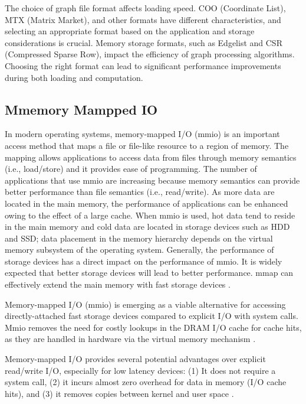 
The choice of graph file format affects loading speed. COO (Coordinate List), MTX (Matrix Market), and other formats have different characteristics, and selecting an appropriate format based on the application and storage considerations is crucial. Memory storage formats, such as Edgelist and CSR (Compressed Sparse Row), impact the efficiency of graph processing algorithms. Choosing the right format can lead to significant performance improvements during both loading and computation.


\subsection{Mmemory Mampped IO}
\label{sec:mmio}

In modern operating systems, memory-mapped I/O (mmio) is an important access method that maps a file or file-like resource to a region of memory. The mapping allows applications to access data from files through memory semantics (i.e., load/store) and it provides ease of programming. The number of applications that use mmio are increasing because memory semantics can provide better performance than file semantics (i.e., read/write). As more data are located in the main memory, the performance of applications can be enhanced owing to the effect of a large cache. When mmio is used, hot data tend to reside in the main memory and cold data are located in storage devices such as HDD and SSD; data placement in the memory hierarchy depends on the virtual memory subsystem of the operating system. Generally, the performance of storage devices has a direct impact on the performance of mmio. It is widely expected that better storage devices will lead to better performance. mmap can effectively extend the main memory with fast storage devices \cite{song2016efficient}.

Memory-mapped I/O (mmio) is emerging as a viable alternative for accessing directly-attached fast storage devices compared to explicit I/O with system calls. Mmio removes the need for costly lookups in the DRAM I/O cache for cache hits, as they are handled in hardware via the virtual memory mechanism \cite{malliotakis2021hugemap}.

Memory-mapped I/O provides several potential advantages over explicit read/write I/O, especially for low latency devices: (1) It does not require a system call, (2) it incurs almost zero overhead for data in memory (I/O cache hits), and (3) it removes copies between kernel and user space \cite{papagiannis2020optimizing}.

